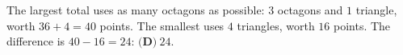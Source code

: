 The largest total uses as many octagons as possible: $3$ octagons and $1$ triangle, worth $36+4=40$ points. The smallest uses $4$ triangles, worth $16$ points. The difference is $40-16=24$: $\boxed{\textbf{(D)}\ 24}$.
